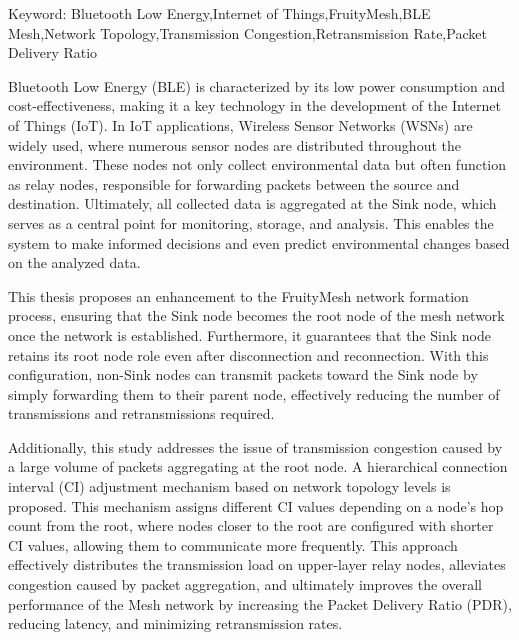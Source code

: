 \begin{EnAbstract}
    \begin{EnAbstractItems}
        \noindent \text Keyword: Bluetooth Low Energy,Internet of Things,FruityMesh,BLE Mesh,Network Topology,Transmission Congestion,Retransmission Rate,Packet Delivery Ratio
    \end{EnAbstractItems}

    \begin{EnAbstractDescription}
        Bluetooth Low Energy (BLE) is characterized by its low power consumption and cost-effectiveness, making it a key technology in the development of the Internet of Things (IoT). In IoT applications, Wireless Sensor Networks (WSNs) are widely used, where numerous sensor nodes are distributed throughout the environment. These nodes not only collect environmental data but often function as relay nodes, responsible for forwarding packets between the source and destination. Ultimately, all collected data is aggregated at the Sink node, which serves as a central point for monitoring, storage, and analysis. This enables the system to make informed decisions and even predict environmental changes based on the analyzed data.

        This thesis proposes an enhancement to the FruityMesh network formation process, ensuring that the Sink node becomes the root node of the mesh network once the network is established. Furthermore, it guarantees that the Sink node retains its root node role even after disconnection and reconnection. With this configuration, non-Sink nodes can transmit packets toward the Sink node by simply forwarding them to their parent node, effectively reducing the number of transmissions and retransmissions required. 

        Additionally, this study addresses the issue of transmission congestion caused by a large volume of packets aggregating at the root node. A hierarchical connection interval (CI) adjustment mechanism based on network topology levels is proposed. This mechanism assigns different CI values depending on a node's hop count from the root, where nodes closer to the root are configured with shorter CI values, allowing them to communicate more frequently. This approach effectively distributes the transmission load on upper-layer relay nodes, alleviates congestion caused by packet aggregation, and ultimately improves the overall performance of the Mesh network by increasing the Packet Delivery Ratio (PDR), reducing latency, and minimizing retransmission rates.
    \end{EnAbstractDescription}
    
\end{EnAbstract}

